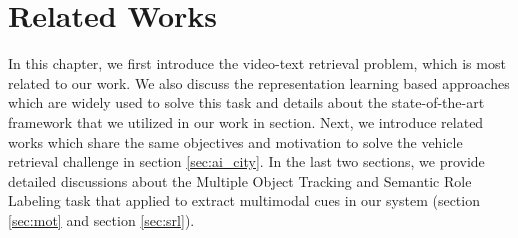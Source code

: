 \chapter{Related Works}
\label{chap-related-works}
\begin{ChapAbstract}
In this chapter, we first introduce the video-text retrieval problem, which is most related to our work. We also discuss the representation learning based approaches which are widely used to solve this task and details about the state-of-the-art framework that we utilized in our work in section. 
Next, we introduce related works which share the same objectives and motivation to solve the vehicle retrieval challenge in section \ref{sec:ai_city}.
In the last two sections, we provide detailed discussions about the Multiple Object Tracking and Semantic Role Labeling task that applied to extract multimodal cues in our system (section \ref{sec:mot} and section \ref{sec:srl}).
\end{ChapAbstract}
% 
% 
% 
% 



